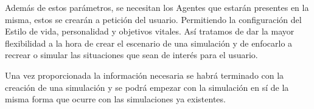 Además de estos parámetros, se necesitan los Agentes que estarán presentes en la misma, estos se crearán a petición del usuario. Permitiendo la configuración del Estilo de vida, personalidad y objetivos vitales. Así tratamos de dar la mayor flexibilidad a la hora de crear el escenario de una simulación y de enfocarlo a recrear o simular las situaciones que sean de interés para el usuario.

Una vez proporcionada la información necesaria se habrá terminado con la creación de una simulación y se podrá empezar con la simulación en sí de la misma forma que ocurre con las simulaciones ya existentes.